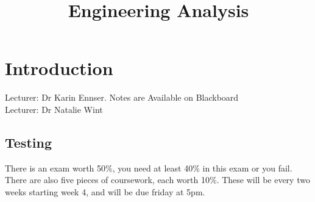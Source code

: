 \documentclass[a4paper, 12pt]{article}
\begin{document}
\title {Engineering Analysis}
\date{}
\maketitle
\tableofcontents

\newpage

\section{Introduction}
	Lecturer: Dr Karin Ennser. Notes are Available on Blackboard \\
	Lecturer: Dr Natalie Wint
	\subsection*{Testing}
		There is an exam worth 50\%, you need at least 40\% in this exam or you fail. \\
		There are also five pieces of coursework, each worth 10\%. These will be every two weeks starting week 4, and will be due friday at 5pm.

\newpage
\end{document}

